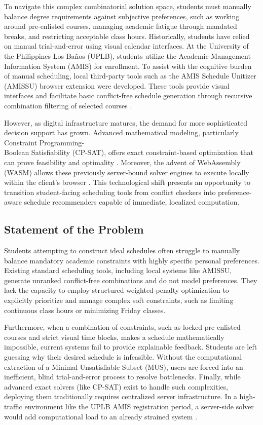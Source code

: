 \documentclass{icsthesis}
\begin{document}
\begin{mainmatter}
		To navigate this complex combinatorial solution space, students must manually balance degree requirements against subjective preferences, such as working around pre-enlisted courses, managing academic fatigue through mandated breaks, and restricting acceptable class hours. Historically, students have relied on manual trial-and-error using visual calendar interfaces. At the University of the Philippines Los Ba\~{n}os (UPLB), students utilize the Academic Management Information System (AMIS) for enrollment. To assist with the cognitive burden of manual scheduling, local third-party tools such as the AMIS Schedule Unitizer (AMISSU) browser extension were developed. These tools provide visual interfaces and facilitate basic conflict-free schedule generation through recursive combination filtering of selected courses \citep{amissu2023}.
		
		However, as digital infrastructure matures, the demand for more sophisticated decision support has grown. Advanced mathematical modeling, particularly Constraint Programming-\\Boolean Satisfiability (CP-SAT), offers exact constraint-based optimization that can prove feasibility and optimality \citep{googlecpsolver2026}. Moreover, the advent of WebAssembly (WASM) allows these previously server-bound solver engines to execute locally within the client's browser \cite{wickman2026}. This technological shift presents an opportunity to transition student-facing scheduling tools from conflict checkers into preference-aware schedule recommenders capable of immediate, localized computation.
		
		\subsection{Statement of the Problem}
		
		Students attempting to construct ideal schedules often struggle to manually balance mandatory academic constraints with highly specific personal preferences. Existing standard scheduling tools, including local systems like AMISSU, generate unranked conflict-free combinations and do not model preferences. They lack the capacity to employ structured weighted-penalty optimization to explicitly prioritize and manage complex soft constraints, such as limiting continuous class hours or minimizing Friday classes.
		
		Furthermore, when a combination of constraints, such as locked pre-enlisted courses and strict visual time blocks, makes a schedule mathematically impossible, current systems fail to provide explainable feedback. Students are left guessing why their desired schedule is infeasible. Without the computational extraction of a Minimal Unsatisfiable Subset (MUS), users are forced into an inefficient, blind trial-and-error process to resolve bottlenecks. Finally, while advanced exact solvers (like CP-SAT) exist to handle such complexities, deploying them traditionally requires centralized server infrastructure. In a high-traffic environment like the UPLB AMIS registration period, a server-side solver would add computational load to an already strained system \citep{hermocilla2022}.
		

\end{mainmatter}
\end{document}
